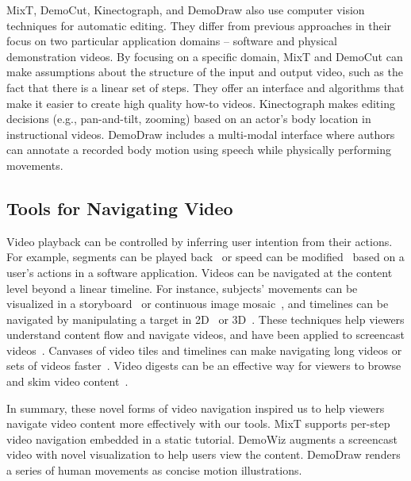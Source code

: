 MixT, DemoCut, Kinectograph, and DemoDraw also use computer vision techniques for automatic editing. They differ from previous approaches in their focus on two particular application domains -- software and physical demonstration videos.
%
By focusing on a specific domain, MixT and DemoCut can make assumptions about the structure of the input and output video, such as the fact that there is a linear set of steps. They offer an interface and algorithms that make it easier to create high quality how-to videos.
%
Kinectograph makes editing decisions (e.g., pan-and-tilt, zooming) based on an actor's body location in instructional videos.
%
DemoDraw includes a multi-modal interface where authors can annotate a recorded body motion using speech while physically performing movements.



\subsection{Tools for Navigating Video}
Video playback can be controlled by inferring user intention from their actions.  For example, segments can be played back~\cite{Pongnumkul:2011ju} or speed can be modified~\cite{Cheng:2009:SUV:1518701.1518823} based on a user's actions in a software application.
%
Videos can be navigated at the content level beyond a linear timeline. For instance, subjects' movements can be visualized in a storyboard~\cite{goldman2006schematic} or continuous image mosaic~\cite{Teodosio:2005:SS:1047936.1047940}, and timelines can be navigated by manipulating a target in 2D~\cite{Dragicevic:2008:VBD:1357054.1357096,Goldman:2008:VOA:1449715.1449719,Karrer:2008:DDM:1357054.1357097} or 3D~\cite{Nguyen:2013:DMV:2470654.2466150}.
%
These techniques help viewers understand content flow and navigate videos, and have been applied to screencast videos~\cite{Denoue:2013:RDM:2451176.2451190,Nguyen:2015:MST:2702123.2702209}.
%
Canvases of video tiles and timelines can make navigating long videos or sets of videos faster~\cite{Al-Hajri:2014:VPH:2611105.2557106}. Video digests can be an effective way for viewers to browse and skim video content~\cite{Pavel:2014:VDB:2642918.2647400}.

In summary, these novel forms of video navigation inspired us to help viewers navigate video content more effectively with our tools.
%
MixT supports per-step video navigation embedded in a static tutorial.
%
DemoWiz augments a screencast video with novel visualization to help users view the content.
%
DemoDraw renders a series of human movements as concise motion illustrations.

